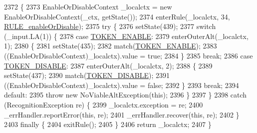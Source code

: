\begin{DoxyCode}
2372                                                                                     \{
2373     EnableOrDisableContext \_localctx = \textcolor{keyword}{new} EnableOrDisableContext(\_ctx, getState());
2374     enterRule(\_localctx, 34, \hyperlink{classgov_1_1nasa_1_1jpf_1_1inspector_1_1client_1_1parser_1_1_console_grammar_parser_a7dba074eb09308de4fb99d34a15923ec}{RULE\_enableOrDisable});
2375     \textcolor{keywordflow}{try} \{
2376       setState(439);
2377       \textcolor{keywordflow}{switch} (\_input.LA(1)) \{
2378       \textcolor{keywordflow}{case} \hyperlink{classgov_1_1nasa_1_1jpf_1_1inspector_1_1client_1_1parser_1_1_console_grammar_parser_a470e2b55da42238181711a5c607b3fd5}{TOKEN\_ENABLE}:
2379         enterOuterAlt(\_localctx, 1);
2380         \{
2381         setState(435);
2382         match(\hyperlink{classgov_1_1nasa_1_1jpf_1_1inspector_1_1client_1_1parser_1_1_console_grammar_parser_a470e2b55da42238181711a5c607b3fd5}{TOKEN\_ENABLE});
2383          ((EnableOrDisableContext)\_localctx).value =  \textcolor{keyword}{true}; 
2384         \}
2385         \textcolor{keywordflow}{break};
2386       \textcolor{keywordflow}{case} \hyperlink{classgov_1_1nasa_1_1jpf_1_1inspector_1_1client_1_1parser_1_1_console_grammar_parser_a90e268d3330c4dd5955ee838092f75ff}{TOKEN\_DISABLE}:
2387         enterOuterAlt(\_localctx, 2);
2388         \{
2389         setState(437);
2390         match(\hyperlink{classgov_1_1nasa_1_1jpf_1_1inspector_1_1client_1_1parser_1_1_console_grammar_parser_a90e268d3330c4dd5955ee838092f75ff}{TOKEN\_DISABLE});
2391          ((EnableOrDisableContext)\_localctx).value =  \textcolor{keyword}{false}; 
2392         \}
2393         \textcolor{keywordflow}{break};
2394       \textcolor{keywordflow}{default}:
2395         \textcolor{keywordflow}{throw} \textcolor{keyword}{new} NoViableAltException(\textcolor{keyword}{this});
2396       \}
2397     \}
2398     \textcolor{keywordflow}{catch} (RecognitionException re) \{
2399       \_localctx.exception = re;
2400       \_errHandler.reportError(\textcolor{keyword}{this}, re);
2401       \_errHandler.recover(\textcolor{keyword}{this}, re);
2402     \}
2403     \textcolor{keywordflow}{finally} \{
2404       exitRule();
2405     \}
2406     \textcolor{keywordflow}{return} \_localctx;
2407   \}
\end{DoxyCode}

